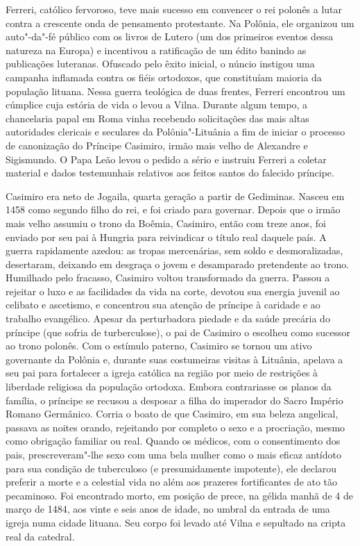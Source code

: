 Ferreri, católico fervoroso, teve mais sucesso em convencer o rei
polonês a lutar contra a crescente onda de pensamento protestante. Na
Polônia, ele organizou um auto"-da"-fé público com os livros de Lutero (um
dos primeiros eventos dessa natureza na Europa) e incentivou a
ratificação de um édito banindo as publicações luteranas. Ofuscado pelo
êxito inicial, o núncio instigou uma campanha inflamada contra os fiéis
ortodoxos, que constituíam maioria da população lituana. Nessa guerra
teológica de duas frentes, Ferreri encontrou um cúmplice cuja estória de
vida o levou a Vilna. Durante algum tempo, a chancelaria papal em Roma
vinha recebendo solicitações das mais altas autoridades clericais e
seculares da Polônia"-Lituânia a fim de iniciar o processo de canonização
do Príncipe Casimiro, irmão mais velho de Alexandre e Sigismundo. O Papa
Leão  levou o pedido a sério e instruiu Ferreri a coletar material e
dados testemunhais relativos aos feitos santos do falecido príncipe.

Casimiro era neto de Jogaila, quarta geração a partir de Gediminas.
Nasceu em 1458 como segundo filho do rei, e foi criado para governar.
Depois que o irmão mais velho assumiu o trono da Boêmia, Casimiro, então
com treze anos, foi enviado por seu pai à Hungria para reivindicar o
título real daquele país. A guerra rapidamente azedou: as tropas
mercenárias, sem soldo e desmoralizadas, desertaram, deixando em
desgraça o jovem e desamparado pretendente ao trono. Humilhado pelo
fracasso, Casimiro voltou transformado da guerra. Passou a rejeitar o
luxo e as facilidades da vida na corte, devotou sua energia juvenil ao
celibato e ascetismo, e concentrou sua atenção de príncipe à caridade e
ao trabalho evangélico. Apesar da perturbadora piedade e da saúde
precária do príncipe (que sofria de turberculose), o pai de Casimiro o
escolheu como sucessor ao trono polonês. Com o estímulo paterno,
Casimiro se tornou um ativo governante da Polônia e, durante suas
costumeiras visitas à Lituânia, apelava a seu pai para fortalecer a
igreja católica na região por meio de restrições à liberdade religiosa
da população ortodoxa. Embora contrariasse os planos da família, o
príncipe se recusou a desposar a filha do imperador do Sacro Império
Romano Germânico. Corria o boato de que Casimiro, em sua beleza
angelical, passava as noites orando, rejeitando por completo o sexo e a
procriação, mesmo como obrigação familiar ou real. Quando os médicos,
com o consentimento dos pais, prescreveram"-lhe sexo com uma bela mulher
como o mais eficaz antídoto para sua condição de tuberculoso (e
presumidamente impotente), ele declarou preferir a morte e a celestial
vida no além aos prazeres fortificantes de ato tão pecaminoso. Foi
encontrado morto, em posição de prece, na gélida manhã de 4 de março de
1484, aos vinte e seis anos de idade, no umbral da entrada de uma igreja
numa cidade lituana. Seu corpo foi levado até Vilna e sepultado na
cripta real da catedral.

